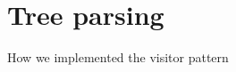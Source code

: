 \section{Tree parsing}
\label{sect:implementation:treeparsing}

How we implemented the visitor pattern